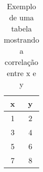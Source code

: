 \begin{table}[!htb]
    \centering
    \caption[Correlação de valores x e y]{Exemplo de uma tabela mostrando a correlação entre x e y\label{tab:correlacao}}
    \begin{tabular}{cc}
        \hline
            x & y \\
        \hline
            1 & 2 \\
            3 & 4 \\
            5 & 6 \\
            7 & 8 \\
        \hline
    \end{tabular}
\end{table}
